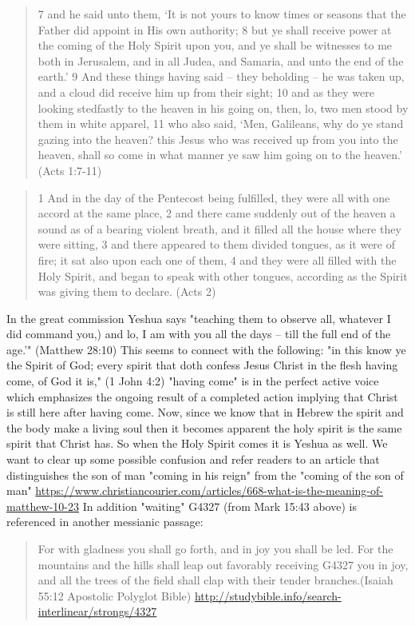 \documentclass[11pt]{article}
\begin{document}
\begin{quote}
7 and he said unto them, `It is not yours to know times or seasons that the Father did appoint in His own authority;
8 but ye shall receive power at the coming of the Holy Spirit upon you, and ye shall be witnesses to me both in Jerusalem, and in all Judea, and Samaria, and unto the end of the earth.'
9 And these things having said -- they beholding -- he was taken up, and a cloud did receive him up from their sight;
10 and as they were looking stedfastly to the heaven in his going on, then, lo, two men stood by them in white apparel,
11 who also said, `Men, Galileans, why do ye stand gazing into the heaven? this Jesus who was received up from you into the heaven, shall so come in what manner ye saw him going on to the heaven.' (Acts 1:7-11)
\end{quote}
\begin{quote}
1 And in the day of the Pentecost being fulfilled, they were all with one accord at the same place,
2 and there came suddenly out of the heaven a sound as of a bearing violent breath, and it filled all the house where they were sitting,
3 and there appeared to them divided tongues, as it were of fire; it sat also upon each one of them,
4 and they were all filled with the Holy Spirit, and began to speak with other tongues, according as the Spirit was giving them to declare. (Acts 2)
\end{quote}
In the great commission Yeshua says "teaching them to observe all, whatever I did command you,) and lo, I am with you all the days -- till the full end of the age.'" (Matthew 28:10) This seems to connect with the following: "in this know ye the Spirit of God; every spirit that doth confess Jesus Christ in the flesh having come, of God it is," (1 John 4:2) "having come" is in the perfect active voice which emphasizes the ongoing result of a completed action implying that Christ is still here after having come. Now, since we know that in Hebrew the spirit and the body make a living soul then it becomes apparent the holy spirit is the same spirit that Christ has. So when the Holy Spirit comes it is Yeshua as well. 
We want to clear up some possible confusion and refer readers to an article that distinguishes the son of man "coming in his reign" from the "coming of the son of man" \url{https://www.christiancourier.com/articles/668-what-is-the-meaning-of-matthew-10-23}
In addition "waiting" G4327 (from Mark 15:43 above) is referenced in another messianic passage:
\begin{quote}
For with gladness you shall go forth, and in joy you shall be led. For the mountains and the hills shall leap out favorably receiving G4327 you in joy, and all the trees of the field shall clap with their tender branches.(Isaiah 55:12 Apostolic Polyglot Bible) \url{http://studybible.info/search-interlinear/strongs/4327}
\end{quote}
\end{document}
